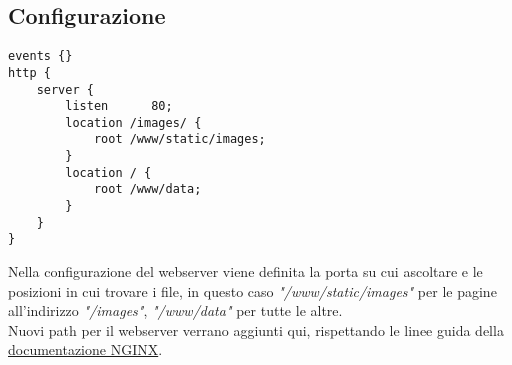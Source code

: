 \documentclass[../DocumentazioneProgetto.tex]{subfiles}
\begin{document}
	\subsection{Configurazione} 
	\label{sec:WebserverConfigurazione}
	\begin{lstlisting}[caption=File di configurazione webserver NGINX] 
events {}
http {
	server {
		listen      80;
		location /images/ {
			root /www/static/images;
		}
		location / {
			root /www/data;
		}
	}
}\end{lstlisting}
	Nella configurazione del webserver viene definita la porta su cui ascoltare e le posizioni in cui trovare i file, in questo caso \textit{"/www/static/images"} per le pagine all'indirizzo \textit{"/images"}, \textit{"/www/data"} per tutte le altre.\\
	Nuovi path per il webserver verrano aggiunti qui, rispettando le linee guida della \href{https://docs.nginx.com/nginx/admin-guide/web-server/web-server/}{documentazione NGINX}.
	
\end{document}

